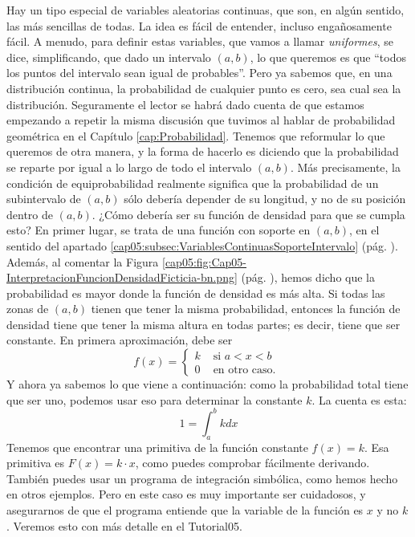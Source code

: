 Hay un tipo especial de variables aleatorias continuas, que son, en algún sentido, las más sencillas de todas. La idea es fácil de entender, incluso engañosamente fácil. A menudo, para definir estas variables, que vamos a llamar {\em uniformes},  se dice, simplificando, que dado  un intervalo $(a,b)$, lo que queremos es que ``todos los puntos del intervalo sean igual de probables''. Pero ya sabemos que, en una distribución continua, la probabilidad de cualquier punto es cero, sea cual sea la distribución. Seguramente el lector se habrá dado cuenta de que estamos empezando a repetir la misma discusión que tuvimos al hablar de probabilidad geométrica en el Capítulo \ref{cap:Probabilidad}. Tenemos que reformular lo que queremos de otra manera, y la forma de hacerlo es diciendo que la probabilidad se reparte por igual a lo largo de todo el intervalo $(a,b)$. Más precisamente, la condición de equiprobabilidad realmente significa que la probabilidad de un subintervalo de $(a,b)$ sólo debería depender de su longitud, y no de su posición dentro de $(a,b)$. ¿Cómo debería ser su función de densidad para que se cumpla esto? En primer lugar, se trata de una función con soporte en $(a,b)$, en el sentido del apartado \ref{cap05:subsec:VariablesContinuasSoporteIntervalo} (pág. \pageref{cap05:subsec:VariablesContinuasSoporteIntervalo}). Además, al comentar la Figura \ref{cap05:fig:Cap05-InterpretacionFuncionDensidadFicticia-bn.png} (pág. \pageref{cap05:fig:Cap05-InterpretacionFuncionDensidadFicticia-bn.png}), hemos dicho que la probabilidad es mayor donde la función de densidad es más alta. Si todas las zonas de $(a,b)$ tienen que tener la misma probabilidad, entonces la función de densidad tiene que tener la misma altura en todas partes; es decir, tiene que ser constante. En primera aproximación, debe ser
\[
f(x)=\begin{cases}
k&\mbox{ si }a<x<b\\
0&\mbox{ en otro caso. }
\end{cases}
\]
Y ahora ya sabemos lo que viene a continuación: como la probabilidad total tiene que ser uno, podemos usar eso para determinar la constante $k$. La cuenta es esta:
\[
1=\int_a^b k dx
\]
Tenemos que encontrar una primitiva de la función constante $f(x)=k$. Esa primitiva es $F(x)=k\cdot x$, como puedes comprobar fácilmente derivando. También puedes usar un programa de integración simbólica, como hemos hecho en otros ejemplos. Pero en este caso es muy importante ser cuidadosos, y asegurarnos de que el programa entiende que la variable de la función es $x$ y no $k$. Veremos esto con más detalle en el Tutorial05.

